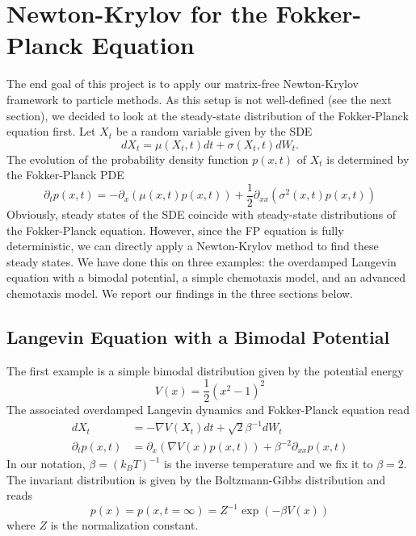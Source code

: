 \documentclass{article}
\begin{document}
\section{Newton-Krylov for the Fokker-Planck Equation}
The end goal of this project is to apply our matrix-free Newton-Krylov framework to particle methods. As this setup is not well-defined (see the next section), we decided to look at the steady-state distribution of the Fokker-Planck equation first. Let $X_t$ be a random variable given by the SDE
\begin{equation}
    dX_t = \mu(X_t, t) dt + \sigma(X_t, t) dW_t.
\end{equation}
The evolution of the probability density function $p(x, t)$ of $X_t$ is determined by the Fokker-Planck PDE
\begin{equation}
    \partial_t p(x,t) = -\partial_x \left(\mu(x,t) p(x,t)\right) + \frac{1}{2}\partial_{xx} \left(\sigma^2(x,t) p(x,t)\right)
\end{equation}
Obviously, steady states of the SDE coincide with steady-state distributions of the Fokker-Planck equation. However, since the FP equation is fully deterministic, we can directly apply a Newton-Krylov method to find these steady states. We have done this on three examples: the overdamped Langevin equation with a bimodal potential, a simple chemotaxis model, and an advanced chemotaxis model. We report our findings in the three sections below.

\subsection{Langevin Equation with a Bimodal Potential}
The first example is a simple bimodal distribution given by the potential energy
\begin{equation} \label{eq:bimodal_potential}
    V(x) = \frac{1}{2}\left(x^2 - 1\right)^2
\end{equation}
The associated overdamped Langevin dynamics and Fokker-Planck equation read
\begin{align}
    dX_t &= -\nabla V(X_t)dt + \sqrt{2} \beta^{-1} dW_t \\
    \partial_t p(x,t) &= \partial_x \left(\nabla V(x) p(x,t)\right) + \beta^{-2} \partial_{xx} p(x,t)
\end{align}
In our notation, $\beta = (k_B T)^{-1}$ is the inverse temperature and we fix it to $\beta=2$. The invariant distribution is given by the Boltzmann-Gibbs distribution and reads
\begin{equation}
    p(x) = p(x,t=\infty)= Z^{-1} \exp\left(-\beta V(x)\right)
\end{equation}
where $Z$ is the normalization constant.
\end{document}
